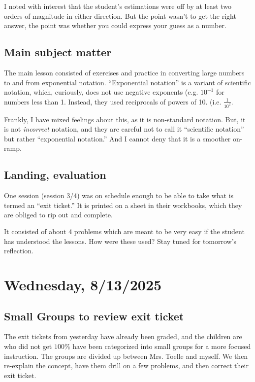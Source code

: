 \documentclass[11pt]{elegantbook}
\begin{document}
\noindent I noted with interest that the student's estimations were
off by at least two orders of magnitude in either direction.  But the
point wasn't to get the right answer, the point was whether you could
express your guess as a number.

\section*{Main subject matter}

The main lesson consisted of exercises and practice in converting
large numbers to and from exponential notation.  ``Exponential
notation'' is a variant of scientific notation, which, curiously, does
not use negative exponents (e.g. $10^{-1}$ for numbers less than 1.
Instead, they used reciprocals of powers of
10. (i.e. $\frac{1}{10^{2}}$.

Frankly, I have mixed feelings about this, as it is non-standard
notation.  But, it is not {\em incorrect} notation, and they are
careful not to call it ``scientific notation'' but rather
``exponential notation.'' And I cannot deny that it is a smoother
on-ramp.

\section*{Landing, evaluation}

One session (session 3/4) was on schedule enough to be able to take
what is termed an ``exit ticket.''  It is printed on a sheet in their
workbooks, which they are obliged to rip out and complete.

It consisted of about 4 problems which are meant to be very easy if
the student has understood the lessons.  How were these used? Stay
tuned for tomorrow's reflection.


\chapter{Wednesday, 8/13/2025}

\section*{Small Groups to review exit ticket}

The exit tickets from yesterday have already been graded, and the
children are who did not get $100\%$ have been categorized into small
groups for a more focused instruction.  The groups are divided up
between Mrs. Toelle and myself.  We then re-explain the concept, have
them drill on a few problems, and then correct their exit ticket.
\end{document}

